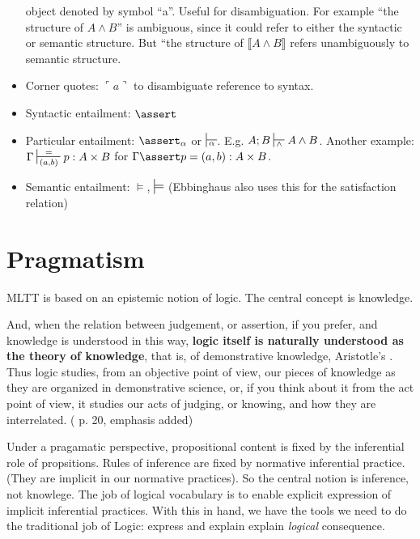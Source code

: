 \documentclass{article}
\begin{document}
\begin{itemize}
  object denoted by symbol ``a''. Useful for disambiguation. For
  example ``the structure of \(A\land B\)'' is ambiguous, since it
  could refer to either the syntactic or semantic structure. But ``the
  structure of \(\llbracket A\land B\rrbracket\) refers unambiguously
  to semantic structure.
\item Corner quotes: \(\ulcorner a\urcorner\) to disambiguate
  reference to syntax.
\item Syntactic entailment: \(\linfer\)
\item Particular entailment: \(\linfer_\alpha\) or
  \(\sststile{\alpha}{}\). E.g. \(A;B\sststile{\land}{}{A\land B}\).
  Another example: \(\Gamma\sststile{(a,b)}{=}{p:A\times B}\) for
  \(\Gamma\linfer p=(a,b):A\times B\).
\item Semantic entailment: \(\models\), \(\sdtstile{}{}\) (Ebbinghaus also uses this for the satisfaction relation)
\end{itemize}

\section{Pragmatism}

MLTT is based on an epistemic notion of logic. The central concept is
knowledge.

\begin{displayquote}
And, when the relation between judgement, or assertion, if you prefer,
and knowledge is understood in this way, \textbf{logic itself is
  naturally understood as the theory of knowledge}, that is, of
demonstrative knowledge, Aristotle’s {}.
Thus logic studies, from an objective point of view, our pieces of
knowledge as they are organized in demonstrative science, or, if you
think about it from the act point of view, it studies our acts of
judging, or knowing, and how they are interrelated.
(\parencite{martin1996meanings} p. 20, emphasis added)
\end{displayquote}


Under a pragamatic perspective, propositional content is fixed by the
inferential role of propsitions. Rules of inference are fixed by
normative inferential practice. (They are implicit in our normative
practices). So the central notion is inference, not knowlege. The job
of logical vocabulary is to enable explicit expression of implicit
inferential practices. With this in hand, we have the tools we need to
do the traditional job of Logic: express and explain explain
\textit{logical} consequence.
\end{document}
